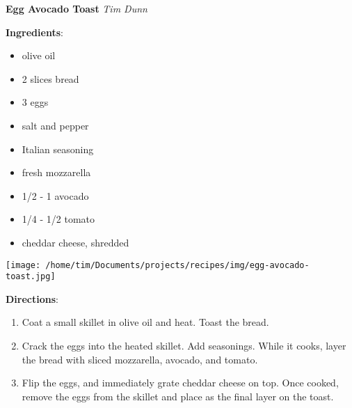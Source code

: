 \documentclass[11pt, twoside, openany]{book}
\begin{document}
\noindent\begin{minipage}[t]{\linewidth}%
{\Large\textbf{Egg Avocado Toast}} \label{egg-avocado-toast}\hfill\textit{Tim Dunn}\\
\noindent\begin{minipage}[t]{0.78\linewidth}%
\textbf{Ingredients}:\vspace{-3mm}
\begin{multicols}{2}
\begin{itemize}\setlength\itemsep{-1mm}
\item olive oil
\item 2 slices bread
\item 3 eggs
\item salt and pepper
\item Italian seasoning
\item fresh mozzarella
\item 1/2 - 1 avocado
\item 1/4 - 1/2 tomato
\item cheddar cheese, shredded
\end{itemize}
\end{multicols}
\end{minipage}
\noindent\begin{minipage}[t]{0.18\linewidth}
\centering \strut\vspace*{-\baselineskip}\newline
\texttt{[image: /home/tim/Documents/projects/recipes/img/egg-avocado-toast.jpg]}\\
\end{minipage}\vspace{3mm}
\textbf{Directions}:
\vspace{-3mm}\begin{enumerate}\setlength\itemsep{-1mm}
\item Coat a small skillet in olive oil and heat. Toast the bread.
\item Crack the eggs into the heated skillet. Add seasonings. While it cooks, layer the bread with sliced mozzarella, avocado, and tomato.
\item Flip the eggs, and immediately grate cheddar cheese on top. Once cooked, remove the eggs from the skillet and place as the final layer on the toast.
\end{enumerate}
\end{minipage}\vspace{8mm}
\end{document}
